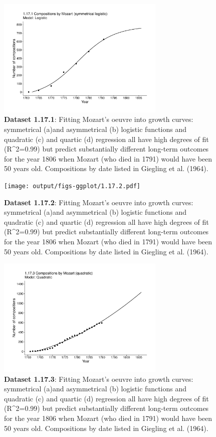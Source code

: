 \documentclass[aps,rmp,preprint,superscriptaddress,10pt,onecolumn]{article}
\begin{document}
\begin{figure}[h]
\includegraphics[width=8cm]{output/figs-ggplot/1.17.1.pdf}
\caption{\textbf{Dataset 1.17.1}: Fitting Mozart's oeuvre into growth curves: symmetrical (a)and asymmetrical (b) logistic functions and quadratic (c) and quartic (d) regression all have high degrees of fit (R^2=0.99) but predict substantially different long-term outcomes for the year 1806 when Mozart (who died in 1791) would have been 50 years old. Compositions by date listed in Giegling et al. (1964).}
\end{figure}
	
\begin{figure}[h]
\texttt{[image: output/figs-ggplot/1.17.2.pdf]}
\caption{\textbf{Dataset 1.17.2}: Fitting Mozart's oeuvre into growth curves: symmetrical (a)and asymmetrical (b) logistic functions and quadratic (c) and quartic (d) regression all have high degrees of fit (R^2=0.99) but predict substantially different long-term outcomes for the year 1806 when Mozart (who died in 1791) would have been 50 years old. Compositions by date listed in Giegling et al. (1964).}
\end{figure}
	
\begin{figure}[h]
\includegraphics[width=8cm]{output/figs-ggplot/1.17.3.pdf}
\caption{\textbf{Dataset 1.17.3}: Fitting Mozart's oeuvre into growth curves: symmetrical (a)and asymmetrical (b) logistic functions and quadratic (c) and quartic (d) regression all have high degrees of fit (R^2=0.99) but predict substantially different long-term outcomes for the year 1806 when Mozart (who died in 1791) would have been 50 years old. Compositions by date listed in Giegling et al. (1964).}
\end{figure}
	
\end{document}

